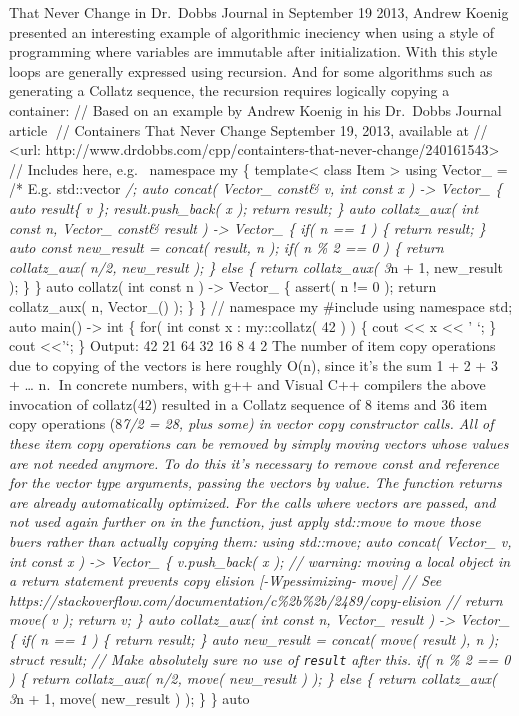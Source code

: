 That Never Change in Dr.~Dobbs Journal in September 19 2013, Andrew
Koenig presented an interesting example of algorithmic ineciency when
using a style of programming where variables are immutable after
initialization. With this style loops are generally expressed using
recursion. And for some algorithms such as generating a Collatz
sequence, the recursion requires logically copying a container: // Based
on an example by Andrew Koenig in his Dr.~Dobbs Journal article //
Containers That Never Change September 19, 2013, available at //
\textless url:
http://www.drdobbs.com/cpp/containters-that-never-change/240161543\textgreater{}
// Includes here, e.g.~ namespace my \{ template\textless{} class Item
\textgreater{} using Vector\_ = /* E.g. std::vector \emph{/; auto
concat( Vector\_ const\& v, int const x ) -\textgreater{} Vector\_ \{
auto result\{ v \}; result.push\_back( x ); return result; \} auto
collatz\_aux( int const n, Vector\_ const\& result ) -\textgreater{}
Vector\_ \{ if( n == 1 ) \{ return result; \} auto const new\_result =
concat( result, n ); if( n \% 2 == 0 ) \{ return collatz\_aux( n/2,
new\_result ); \} else \{ return collatz\_aux( 3}n + 1, new\_result );
\} \} auto collatz( int const n ) -\textgreater{} Vector\_ \{ assert( n
!= 0 ); return collatz\_aux( n, Vector\_() ); \} \} // namespace my
\#include using namespace std; auto main() -\textgreater{} int \{ for(
int const x : my::collatz( 42 ) ) \{ cout \textless\textless{} x
\textless\textless{} ' `; \} cout \textless\textless{}'\n`; \} Output:
42 21 64 32 16 8 4 2 The number of item copy operations due to copying
of the vectors is here roughly O(n), since it's the sum 1 + 2 + 3 +
\ldots{} n. In concrete numbers, with g++ and Visual C++ compilers the
above invocation of collatz(42) resulted in a Collatz sequence of 8
items and 36 item copy operations (8\emph{7/2 = 28, plus some) in vector
copy constructor calls. All of these item copy operations can be removed
by simply moving vectors whose values are not needed anymore. To do this
it's necessary to remove const and reference for the vector type
arguments, passing the vectors by value. The function returns are
already automatically optimized. For the calls where vectors are passed,
and not used again further on in the function, just apply std::move to
move those buers rather than actually copying them: using std::move;
auto concat( Vector\_ v, int const x ) -\textgreater{} Vector\_ \{
v.push\_back( x ); // warning: moving a local object in a return
statement prevents copy elision {[}-Wpessimizing- move{]} // See
https://stackoverflow.com/documentation/c\%2b\%2b/2489/copy-elision //
return move( v ); return v; \} auto collatz\_aux( int const n, Vector\_
result ) -\textgreater{} Vector\_ \{ if( n == 1 ) \{ return result; \}
auto new\_result = concat( move( result ), n ); struct result; // Make
absolutely sure no use of \passthrough{\lstinline!result!} after this.
if( n \% 2 == 0 ) \{ return collatz\_aux( n/2, move( new\_result ) ); \}
else \{ return collatz\_aux( 3}n + 1, move( new\_result ) ); \} \} auto
